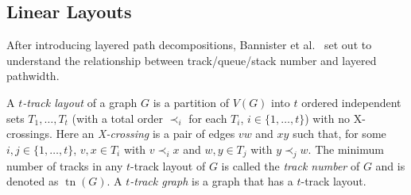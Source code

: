 \documentclass{jgaa-art}
\newcommand{\etal}{et al.}
\DeclareMathOperator{\tr}{tn}
\begin{document}


\subsection{Linear Layouts}

After introducing layered path decompositions, Bannister \etal\ \cite{DBLP:conf/gd/BannisterDDEW16,bannister2018track} set
out to understand the relationship between track/queue/stack number and
layered pathwidth.

A \emph{$t$-track layout} of a graph
$G$ is a partition of $V(G)$ into $t$ ordered independent sets $T_1,\ldots,T_t$ (with a total order $\prec_i$ for each $T_i$, $i\in\{1,\ldots,t\}$) with no X-crossings. Here an \emph{X-crossing} is a pair of edges $vw$ and $xy$ such that, for some $i,j\in\{1,\ldots,t\}$, $v,x\in T_i$ with $v\prec_i x$ and $w,y\in T_j$ with $y\prec_j w$. The minimum number of tracks in any $t$-track layout of $G$ is called the \emph{track number} of $G$ and is denoted as $\tr(G)$. A \emph{$t$-track graph} is a graph that has a $t$-track layout.
\end{document}
